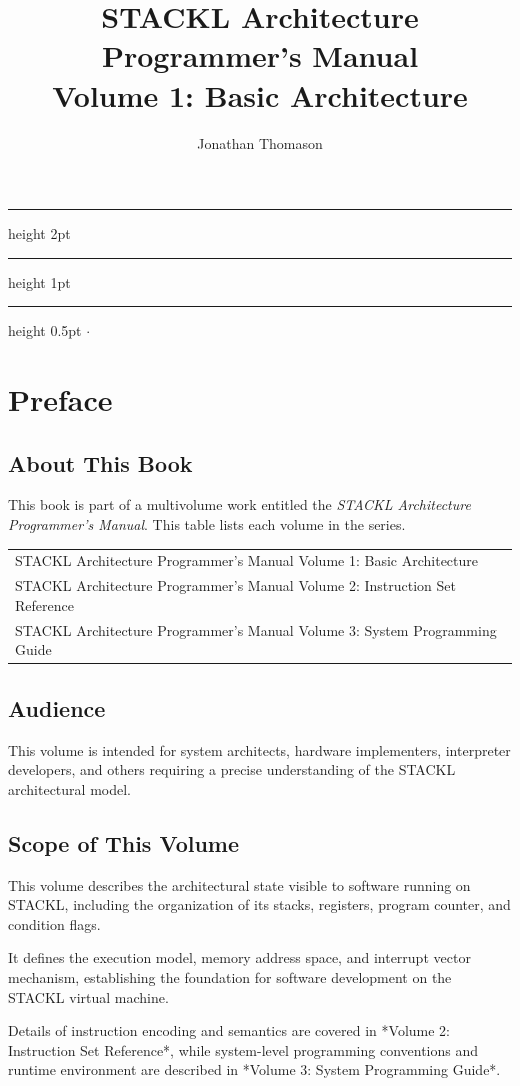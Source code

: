 \documentclass[11pt,a4paper,oneside]{book}
\title{
	STACKL Architecture\\
	Programmer's Manual\\
	\large Volume 1: Basic Architecture
}
\author{Jonathan Thomason}
\makeatletter
\renewcommand{\maketitle}{%
  \vspace*{2cm} %
  \begin{center}
    \begingroup
      \hrule height 2pt %
      \vspace{0.5\baselineskip}
      {\Huge \bfseries \@title \par}%
      \vspace{0.5\baselineskip}
      \hrule height 1pt %
    \endgroup
    \par
  \end{center}
  \vfill %
  \begin{center}
    \begingroup
      \footnotesize
      \hrule height 0.5pt %
      \vspace{0.5em}
      \@author \quad $\cdot$ \quad \@date %
      \vspace{0.5em}
    \endgroup
  \end{center}
}
\makeatother
\begin{document}
\frontmatter
\thispagestyle{empty}
\maketitle

\setcounter{page}{0}
\tableofcontents

\chapter{Preface}

\section{About This Book}
This book is part of a multivolume work entitled the \textit{STACKL Architecture
Programmer's Manual}. This table lists each volume in the series.

\begin{table}[H]
\centering
	\begin{tabular}{l}
		STACKL Architecture Programmer's Manual Volume 1: Basic Architecture\\
		STACKL Architecture Programmer's Manual Volume 2: Instruction Set Reference\\
		STACKL Architecture Programmer's Manual Volume 3: System Programming Guide\\
	\end{tabular}
\end{table}

\section{Audience}
This volume is intended for system architects, hardware implementers,
interpreter developers, and others requiring a precise understanding of
the STACKL architectural model.

\section{Scope of This Volume}
This volume describes the architectural state visible to software running on
STACKL, including the organization of its stacks, registers, program counter,
and condition flags.

It defines the execution model, memory address space, and interrupt vector
mechanism, establishing the foundation for software development on the
STACKL virtual machine.

Details of instruction encoding and semantics are covered in *Volume 2:
Instruction Set Reference*, while system-level programming conventions and
runtime environment are described in *Volume 3: System Programming Guide*.
\end{document}
